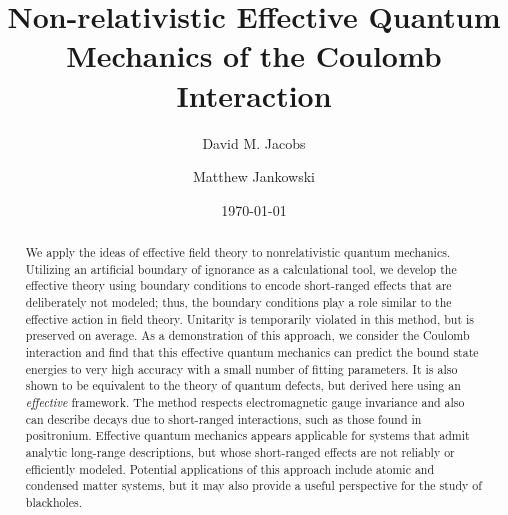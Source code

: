 \documentclass[pra,twocolumn,nofootinbib, superscriptaddress]{revtex4}%
\begin{document}

\title{Non-relativistic Effective Quantum Mechanics of the Coulomb Interaction}%


\author{David M. Jacobs}%



\author{Matthew Jankowski}



\date{\today}%

\begin{abstract}
We apply the ideas of effective field theory to nonrelativistic quantum mechanics. Utilizing an artificial boundary of ignorance as a calculational tool, we develop the effective theory using boundary conditions to encode short-ranged effects that are deliberately not modeled; thus, the boundary conditions play a role similar to the effective action in field theory. Unitarity is temporarily violated in this method, but is preserved on average. As a demonstration of this approach, we consider the Coulomb interaction and find that this effective quantum mechanics can predict the bound state energies to very high accuracy with a small number of fitting parameters. It is also shown to be equivalent to the theory of quantum defects, but derived here using an \emph{effective} framework. The method respects electromagnetic gauge invariance and also can describe decays due to short-ranged interactions, such as those found in positronium. Effective quantum mechanics appears applicable for systems that admit analytic long-range descriptions, but whose short-ranged effects are not reliably or efficiently modeled. Potential applications of this approach include atomic and condensed matter systems, but it may also provide a useful perspective for the study of blackholes.
\end{abstract}

\maketitle
\end{document}
